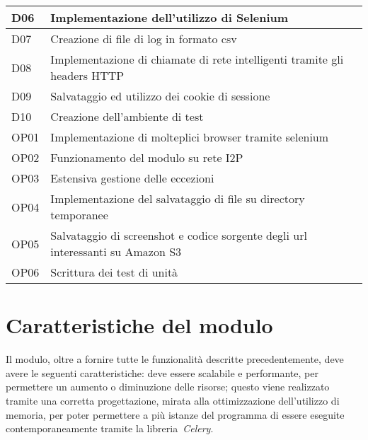 \begin{longtable}{|p{}|p{}|}
    \hline 
    D06			&	Implementazione dell’utilizzo di Selenium \\
    \hline
    D07			&	Creazione di file di log in formato csv \\
    \hline
    D08			&	Implementazione di chiamate di rete intelligenti tramite gli headers HTTP \\
    \hline
    D09			&	Salvataggio ed utilizzo dei cookie di sessione \\
    \hline
    D10			&	Creazione dell’ambiente di test \\
    \hline
    OP01		&	Implementazione di molteplici browser tramite selenium \\
    \hline
    OP02		&	Funzionamento del modulo su rete I2P \\
    \hline
    OP03		&	Estensiva gestione delle eccezioni \\
    \hline
    OP04		&	Implementazione del salvataggio di file su directory temporanee \\
    \hline
    OP05		&	Salvataggio di screenshot e codice sorgente degli url interessanti su Amazon S3 \\
    \hline
    OP06		&	Scrittura dei test di unità \\
    \hline
\end{longtable}%

\section{Caratteristiche del modulo}

Il modulo, oltre a fornire tutte le funzionalità descritte precedentemente, deve avere le
seguenti caratteristiche: deve essere scalabile e performante, per permettere un aumento o diminuzione delle risorse; questo viene realizzato tramite una corretta progettazione, mirata alla ottimizzazione dell’utilizzo di memoria, per poter permettere a più istanze del programma di essere eseguite contemporaneamente tramite la libreria~\emph{Celery}.
